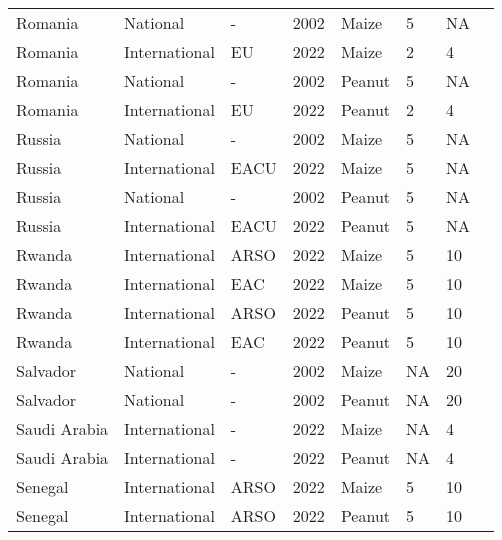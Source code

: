\begin{landscape}
\begin{longtable}[c]{llllllll}
Romania           & National      & -        & 2002 & Maize  & 5  & NA & \citet{van2004worldwide}     \\
Romania           & International & EU       & 2022 & Maize  & 2  & 4  & \citet{EC2010}               \\
Romania           & National      & -        & 2002 & Peanut & 5  & NA & \citet{van2004worldwide}     \\
Romania           & International & EU       & 2022 & Peanut & 2  & 4  & \citet{EC2010}               \\
Russia            & National      & -        & 2002 & Maize  & 5  & NA & \citet{van2004worldwide}     \\
Russia            & International & EACU     & 2022 & Maize  & 5  & NA & \citet{EACU2011}             \\
Russia            & National      & -        & 2002 & Peanut & 5  & NA & \citet{van2004worldwide}     \\
Russia            & International & EACU     & 2022 & Peanut & 5  & NA & \citet{EACU2011}             \\
Rwanda            & International & ARSO     & 2022 & Maize  & 5  & 10 & \citet{ARSO2022}             \\
Rwanda            & International & EAC      & 2022 & Maize  & 5  & 10 & \citet{EAC2018}              \\
Rwanda            & International & ARSO     & 2022 & Peanut & 5  & 10 & \citet{ARSO2022}             \\
Rwanda            & International & EAC      & 2022 & Peanut & 5  & 10 & \citet{EAC2018}              \\
Salvador          & National      & -        & 2002 & Maize  & NA & 20 & \citet{van2004worldwide}     \\
Salvador          & National      & -        & 2002 & Peanut & NA & 20 & \citet{van2004worldwide}     \\
Saudi Arabia      & International & -        & 2022 & Maize  & NA & 4  & \citet{van2004worldwide}     \\
Saudi Arabia      & International & -        & 2022 & Peanut & NA & 4  & \citet{van2004worldwide}     \\
Senegal           & International & ARSO     & 2022 & Maize  & 5  & 10 & \citet{ARSO2022}             \\
Senegal           & International & ARSO     & 2022 & Peanut & 5  & 10 & \citet{ARSO2022}             \\

\end{longtable}
\end{landscape}
